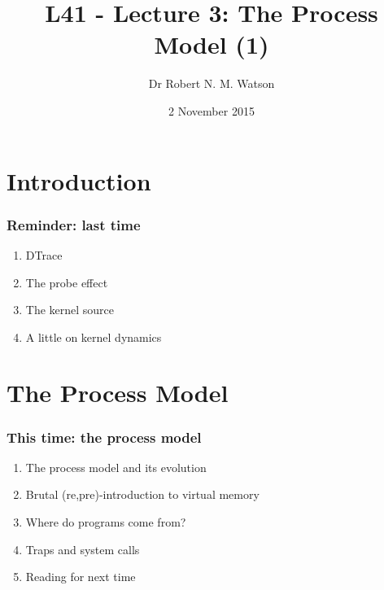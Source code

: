 %
%
%
%

{
}

\usepackage[english]{babel}
\usepackage[latin1]{inputenc}
\usepackage{graphicx}
\usepackage{times}
\usepackage[T1]{fontenc}
\usepackage{fancyvrb}
\usepackage{listings}


\title{L41 - Lecture 3: The Process Model (1)}
\author{Dr Robert N. M. Watson}
\date{2 November 2015}

\begin{frame}
  \titlepage
\end{frame}

\section{Introduction}

\begin{frame}
  \frametitle{Reminder: last time}

  \begin{enumerate}
    \item DTrace
    \item The probe effect
    \item The kernel source
    \item A little on kernel dynamics
  \end{enumerate}
\end{frame}

\section{The Process Model}

\begin{frame}
  \frametitle{This time: the process model}

  \begin{enumerate}
    \item The process model and its evolution
    \item Brutal (re,pre)-introduction to virtual memory
    \item Where do programs come from?
    \item Traps and system calls
    \item Reading for next time
  \end{enumerate}
\end{frame}

